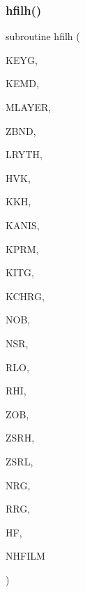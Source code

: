 \subsubsection{\texorpdfstring{hfilh()}{hfilh()}}
{\footnotesize\ttfamily subroutine hfilh (\begin{DoxyParamCaption}\item[{integer, intent(in)}]{K\+E\+YG,  }\item[{integer, intent(in)}]{K\+E\+MD,  }\item[{integer, intent(in)}]{M\+L\+A\+Y\+ER,  }\item[{real, dimension(0\+:mlayer), intent(in)}]{Z\+B\+ND,  }\item[{real, dimension(mlayer), intent(in)}]{L\+R\+Y\+TH,  }\item[{real, dimension(0\+:mlayer), intent(in)}]{H\+VK,  }\item[{complex, dimension(0\+:mlayer), intent(in)}]{K\+KH,  }\item[{integer, intent(in)}]{K\+A\+N\+IS,  }\item[{integer, intent(in)}]{K\+P\+RM,  }\item[{integer, intent(in)}]{K\+I\+TG,  }\item[{integer, intent(in)}]{K\+C\+H\+RG,  }\item[{integer, intent(in)}]{N\+OB,  }\item[{integer, intent(in)}]{N\+SR,  }\item[{real, intent(in)}]{R\+LO,  }\item[{real, intent(in)}]{R\+HI,  }\item[{real, intent(in)}]{Z\+OB,  }\item[{real, intent(in)}]{Z\+S\+RH,  }\item[{real, intent(in)}]{Z\+S\+RL,  }\item[{integer, intent(out)}]{N\+RG,  }\item[{real, dimension(nhfilm), intent(out)}]{R\+RG,  }\item[{complex, dimension(11,nhfilm), intent(out)}]{HF,  }\item[{integer, intent(in)}]{N\+H\+F\+I\+LM }\end{DoxyParamCaption})}

